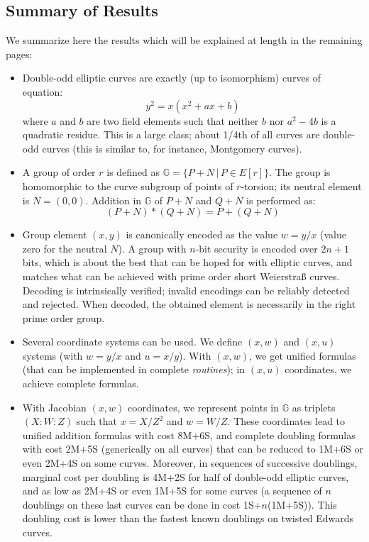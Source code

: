 \documentclass{llncs}
\newcommand{\bG}{\mathbb{G}}
\begin{document}
\subsection{Summary of Results}

We summarize here the results which will be explained at length in the
remaining pages:
\begin{itemize}

    \item Double-odd elliptic curves are exactly (up to isomorphism)
    curves of equation:
    \begin{equation*}
        y^2 = x(x^2 + ax + b)
    \end{equation*}
    where $a$ and $b$ are two field elements such that neither $b$ nor
    $a^2 - 4b$ is a quadratic residue. This is a large class; about
    1/4th of all curves are double-odd curves (this is similar to, for
    instance, Montgomery curves).

    \item A group of order $r$ is defined as
    $\bG = \{ P+N \,|\, P \in E[r] \}$. The group is homomorphic to the
    curve subgroup of points of $r$-torsion; its neutral element is
    $N = (0, 0)$. Addition in $\bG$ of $P+N$ and $Q+N$ is performed as:
    \begin{equation*}
        (P + N) * (Q + N) = P + (Q + N)
    \end{equation*}

    \item Group element $(x, y)$ is canonically encoded as the value
    $w = y/x$ (value zero for the neutral $N$). A group with $n$-bit
    security is encoded over $2n+1$ bits, which is about the best that
    can be hoped for with elliptic curves, and matches what can be
    achieved with prime order short Weierstraß curves. Decoding is
    intrinsically verified; invalid encodings can be reliably detected
    and rejected. When decoded, the obtained element is necessarily in
    the right prime order group.

    \item Several coordinate systems can be used. We define $(x, w)$ and
    $(x, u)$ systems (with $w = y/x$ and $u = x/y$). With $(x, w)$, we
    get unified formulas (that can be implemented in complete
    \emph{routines}); in $(x, u)$ coordinates, we achieve complete
    formulas.

    \item With Jacobian $(x, w)$ coordinates, we represent points in
    $\bG$ as triplets $(X{:}W{:}Z)$ such that $x = X/Z^2$ and $w = W/Z$.
    These coordinates lead to unified addition formulas with cost 8M+6S,
    and complete doubling formulas with cost 2M+5S (generically on all
    curves) that can be reduced to 1M+6S or even 2M+4S on some curves.
    Moreover, in sequences of successive doublings, marginal cost per
    doubling is 4M+2S for half of double-odd elliptic curves, and as low
    as 2M+4S or even 1M+5S for some curves (a sequence of $n$ doublings
    on these last curves can be done in cost 1S+$n$(1M+5S)). This
    doubling cost is lower than the fastest known doublings on twisted
    Edwards curves.


\end{itemize}
\end{document}
